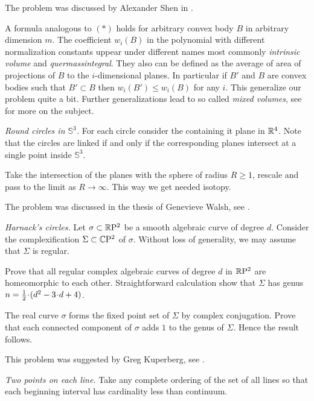 The problem was discussed by Alexander Shen in \cite{shen}.

A formula analogous to $({*})$
holds for arbitrary convex body $B$ in arbitrary dimension $m$.
The coefficient $w_i(B)$ in the polynomial with different normalization constants 
uppear under different names most commonly
\emph{intrinsic volume} and
\emph{quermassintegral}.
They also can be defined as the average 
of area of projections of $B$ to the $i$-dimensional planes.
In particular if $B'$ and $B$ are convex bodies such that $B'\subset B$
then $w_i(B')\le w_i(B)$ for any $i$.
This generalize our problem quite a bit.
Further generalizations lead to so called \emph{mixed volumes},
see \cite{burago-zalgaller} for more on the subject.



\textit{Round circles in $\mathbb{S}^3$.}
For each circle consider the containing it plane in $\mathbb{R}^4$.
Note that the circles are linked 
if and only if 
the corresponding planes intersect at a single point inside $\mathbb{S}^3$.

Take the intersection of the planes with the sphere of radius $R\ge 1$,
rescale and pass to the limit as $R\to\infty$.  
This way we get needed isotopy.

The problem was discussed in the thesis of Genevieve Walsh, see \cite{walsh}.

\textit{Harnack's circles.}
Let $\sigma\subset \mathbb{R}\mathrm{P}^2$ be a smooth algebraic curve of degree $d$.
Consider the complexification $\Sigma\subset \mathbb{C}\mathrm{P}^2$ of $\sigma$.
Without loss of generality, we may assume that $\Sigma$ is regular.

Prove that all regular complex algebraic curves of degree $d$ in $\mathbb{R}\mathrm{P}^2$
are homeomorphic to each other.
Straightforward calculation show that $\Sigma$ has genus $n\z=\tfrac12\cdot(d^2-3\cdot d+4)$.

The real curve $\sigma$ forms the fixed point set of $\Sigma$ by complex conjugation. 
Prove that each connected component of $\sigma$ adds $1$ to the genus of $\Sigma$.
Hence the result follows.

This problem was suggested by Greg Kuperberg, see \cite{One-step problems in geometry}.



\textit{Two points on each line.}
Take any complete ordering of the set of all lines 
so that each beginning interval has cardinality less than continuum.

